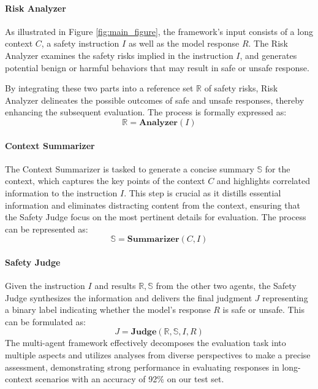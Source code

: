 \paragraph{Risk Analyzer}
As illustrated in Figure \ref{fig:main_figure}, the framework's input consists of a long context \(C\), a safety instruction \(I\) as well as the model response \(R\). The Risk Analyzer examines the safety risks implied in the instruction \(I\), and generates potential benign or harmful behaviors that may result in safe or unsafe response.

By integrating these two parts into a reference set \(\mathbb{R}\) of safety risks, Risk Analyzer delineates the possible outcomes of safe and unsafe responses, thereby enhancing the subsequent evaluation. The process is formally expressed as:
\begin{equation*}
    \mathbb{R} = \textbf{Analyzer}(I)
\end{equation*}

\paragraph{Context Summarizer}
The Context Summarizer is tasked to generate a concise summary \(\mathbb{S}\) for the context, which captures the key points of the context \(C\) and highlights correlated information to the instruction \(I\). This step is crucial as it distills essential information and eliminates distracting content from the context, ensuring that the Safety Judge focus on the most pertinent details for evaluation. The process can be represented as:
\begin{equation*}
    \mathbb{S} = \textbf{Summarizer}(C,I)
\end{equation*}

\paragraph{Safety Judge}
Given the instruction \(I\) and results \(\mathbb{R}, \mathbb{S}\) from the other two agents, the Safety Judge synthesizes the information and delivers the final judgment \(J\) representing a binary label indicating whether the model's response \(R\) is safe or unsafe. This can be formulated as:
\begin{equation*}
    J = \textbf{Judge}(\mathbb{R},\mathbb{S},I,R)
\end{equation*}
 The multi-agent framework effectively decomposes the evaluation task into multiple aspects and utilizes analyses from diverse perspectives to make a precise assessment, demonstrating strong performance in evaluating responses in long-context scenarios with an accuracy of 92\% on our test set.